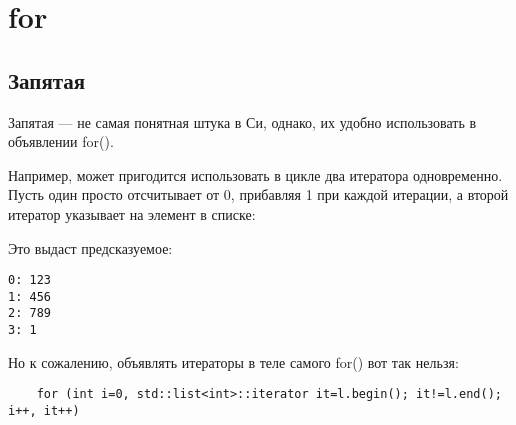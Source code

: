 ﻿\section{for}

\subsection{Запятая}

Запятая --- не самая понятная штука в Си, однако, их удобно использовать в объявлении for().

Например, может пригодится использовать в цикле два итератора одновременно. Пусть один просто отсчитывает
от 0, прибавляя 1 при каждой итерации, а второй итератор указывает на элемент в списке:



Это выдаст предсказуемое:

\begin{lstlisting}
0: 123
1: 456
2: 789
3: 1
\end{lstlisting}

Но к сожалению, объявлять итераторы в теле самого for() вот так нельзя:

\begin{lstlisting}
	for (int i=0, std::list<int>::iterator it=l.begin(); it!=l.end(); i++, it++)
\end{lstlisting}

